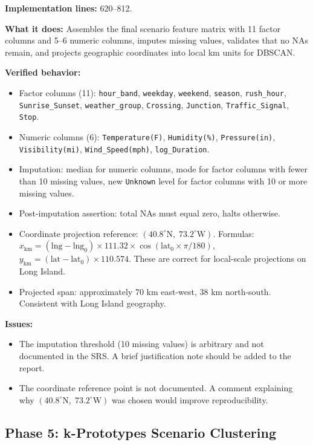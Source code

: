 \documentclass[11pt]{article}
\begin{document}
\textbf{Implementation lines:} 620--812.

\textbf{What it does:} Assembles the final scenario feature matrix with 11 factor
columns and 5--6 numeric columns, imputes missing values, validates that no NAs
remain, and projects geographic coordinates into local km units for DBSCAN.

\textbf{Verified behavior:}
\begin{itemize}
\item Factor columns (11): \texttt{hour\_band}, \texttt{weekday}, \texttt{weekend},
  \texttt{season}, \texttt{rush\_hour}, \texttt{Sunrise\_Sunset},
  \texttt{weather\_group}, \texttt{Crossing}, \texttt{Junction},
  \texttt{Traffic\_Signal}, \texttt{Stop}.
\item Numeric columns (6): \texttt{Temperature(F)}, \texttt{Humidity(\%)},
  \texttt{Pressure(in)}, \texttt{Visibility(mi)}, \texttt{Wind\_Speed(mph)},
  \texttt{log\_Duration}.
\item Imputation: median for numeric columns, mode for factor columns with fewer
  than 10 missing values, new \texttt{Unknown} level for factor columns with
  10 or more missing values.
\item Post-imputation assertion: total NAs must equal zero, halts otherwise.
\item Coordinate projection reference: $(40.8^\circ\text{N},\; 73.2^\circ\text{W})$.
  Formulas: $x_\text{km} = (\text{lng} - \text{lng}_0) \times 111.32 \times
  \cos(\text{lat}_0 \times \pi / 180)$, $y_\text{km} = (\text{lat} - \text{lat}_0)
  \times 110.574$. These are correct for local-scale projections on Long Island.
\item Projected span: approximately 70 km east-west, 38 km north-south. Consistent
  with Long Island geography.
\end{itemize}

\textbf{Issues:}
\begin{itemize}
\item The imputation threshold (10 missing values) is arbitrary and not documented
  in the SRS. A brief justification note should be added to the report.
\item The coordinate reference point is not documented. A comment explaining
  why $(40.8^\circ\text{N},\; 73.2^\circ\text{W})$ was chosen would improve
  reproducibility.
\end{itemize}

\subsection{Phase 5: k-Prototypes Scenario Clustering}
\end{document}
